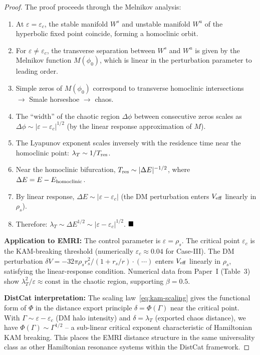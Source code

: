 \begin{proof}
The proof proceeds through the Melnikov analysis:
\begin{enumerate}
\item At $\varepsilon = \varepsilon_c$, the stable manifold $W^s$ and unstable manifold $W^u$ of the hyperbolic fixed point coincide, forming a homoclinic orbit.
\item For $\varepsilon \neq \varepsilon_c$, the transverse separation between $W^s$ and $W^u$ is given by the Melnikov function $M(\phi_0)$, which is linear in the perturbation parameter to leading order.
\item Simple zeros of $M(\phi_0)$ correspond to transverse homoclinic intersections $\to$ Smale horseshoe $\to$ chaos.
\item The ``width'' of the chaotic region $\Delta\phi$ between consecutive zeros scales as $\Delta\phi \sim |\varepsilon - \varepsilon_c|^{1/2}$ (by the linear response approximation of $M$).
\item The Lyapunov exponent scales inversely with the residence time near the homoclinic point: $\lambda_T \sim 1/T_{\rm res}$.
\item Near the homoclinic bifurcation, $T_{\rm res} \sim |\Delta E|^{-1/2}$, where $\Delta E = E - E_{\rm homoclinic}$.
\item By linear response, $\Delta E \sim |\varepsilon - \varepsilon_c|$ (the DM perturbation enters $V_{\rm eff}$ linearly in $\rho_s$).
\item Therefore: $\lambda_T \sim \Delta E^{1/2} \sim |\varepsilon - \varepsilon_c|^{1/2}$. $\hfill\blacksquare$
\end{enumerate}

\textbf{Application to EMRI:} The control parameter is $\varepsilon = \rho_s$. The critical point $\varepsilon_c$ is the KAM-breaking threshold (numerically $\varepsilon_c \approx 0.04$ for Case-III). The DM perturbation $\delta V = -32\pi\rho_s r_s^2/(1+r_s/r) \cdot (\cdots)$ enters $V_{\rm eff}$ linearly in $\rho_s$, satisfying the linear-response condition. Numerical data from Paper~I (Table~3) show $\lambda_T^2/\varepsilon \approx \text{const}$ in the chaotic region, supporting $\beta = 0.5$.

\textbf{DistCat interpretation:} The scaling law~\eqref{eq:kam-scaling} gives the functional form of $\Phi$ in the distance export principle $\delta = \Phi(\Gamma)$ near the critical point. With $\Gamma \sim \varepsilon - \varepsilon_c$ (DM halo intensity) and $\delta = \lambda_T$ (exported chaos distance), we have $\Phi(\Gamma) \sim \Gamma^{1/2}$ -- a sub-linear critical exponent characteristic of Hamiltonian KAM breaking. This places the EMRI distance structure in the same universality class as other Hamiltonian resonance systems within the DistCat framework.
\end{proof}

